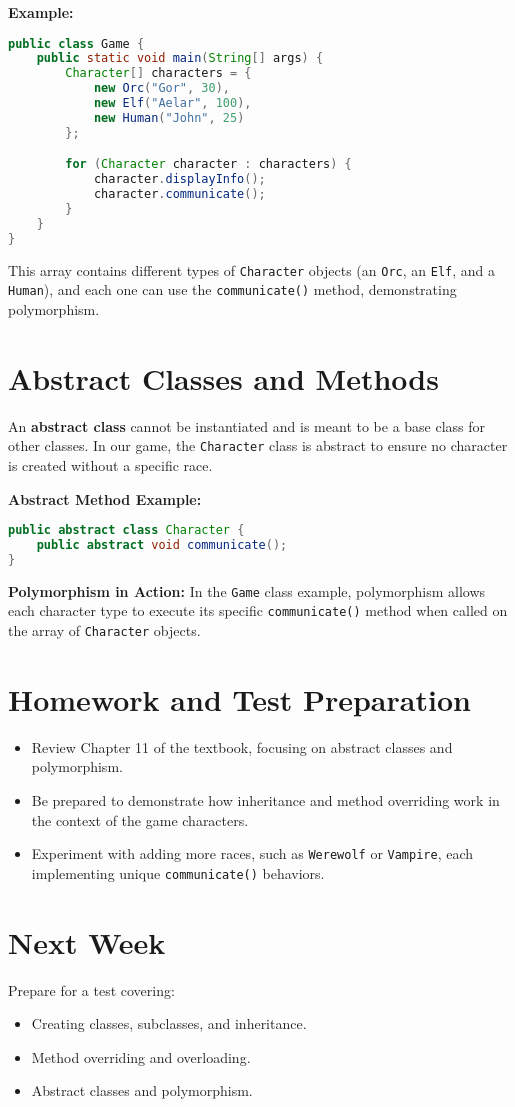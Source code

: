 \documentclass{article}
\begin{document}
\textbf{Example:}
\begin{lstlisting}[language=Java]
public class Game {
    public static void main(String[] args) {
        Character[] characters = {
            new Orc("Gor", 30),
            new Elf("Aelar", 100),
            new Human("John", 25)
        };

        for (Character character : characters) {
            character.displayInfo();
            character.communicate();
        }
    }
}
\end{lstlisting}

This array contains different types of \texttt{Character} objects (an \texttt{Orc}, an \texttt{Elf}, and a \texttt{Human}), and each one can use the \texttt{communicate()} method, demonstrating polymorphism.

\section{Abstract Classes and Methods}
An \textbf{abstract class} cannot be instantiated and is meant to be a base class for other classes. In our game, the \texttt{Character} class is abstract to ensure no character is created without a specific race.

\textbf{Abstract Method Example:}
\begin{lstlisting}[language=Java]
public abstract class Character {
    public abstract void communicate();
}
\end{lstlisting}

\textbf{Polymorphism in Action:}
In the \texttt{Game} class example, polymorphism allows each character type to execute its specific \texttt{communicate()} method when called on the array of \texttt{Character} objects.

\section{Homework and Test Preparation}
\begin{itemize}
    \item Review Chapter 11 of the textbook, focusing on abstract classes and polymorphism.
    \item Be prepared to demonstrate how inheritance and method overriding work in the context of the game characters.
    \item Experiment with adding more races, such as \texttt{Werewolf} or \texttt{Vampire}, each implementing unique \texttt{communicate()} behaviors.
\end{itemize}

\section{Next Week}
Prepare for a test covering:
\begin{itemize}
    \item Creating classes, subclasses, and inheritance.
    \item Method overriding and overloading.
    \item Abstract classes and polymorphism.
\end{itemize}
\end{document}
